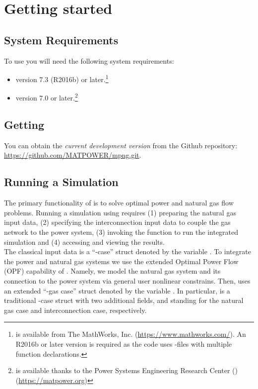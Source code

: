 \chapter{Getting started}
\label{chap:get_started}

\section{System Requirements}
\label{sec:requirements}

To use \mpng{} you will need the following system requirements:

\begin{itemize}
	\item[\checkmark] \matlab{}\textsuperscript{\tiny \textregistered} version 7.3 (R2016b) or later.\footnote{\matlab{} is available from The MathWorks, Inc. (\url{https://www.mathworks.com/}). An R2016b or later \matlab{} version is required as the \mpng{} code uses \matlab{}-files with multiple function declarations.}
	
	\item[\checkmark] \matpower{} version 7.0 or later.\footnote{\matpower{} is available thanks to the Power Systems Engineering Research Center (\pserc) (\url{https://matpower.org})}
\end{itemize}

\section{Getting \mpng{}}
\label{sec:get_mpng}

You can obtain the \emph{current development version} from the \matpower{} Github repository: \url{https://github.com/MATPOWER/mpng.git}.


\section{Running a Simulation}
\label{sec:simulate}

The primary functionality of \mpng{} is to solve optimal power and natural gas flow problems. Running a simulation using \mpng{} requires (1) preparing the natural gas input data, (2) specifying the interconnection input data to couple the gas network to the power system, (3) invoking the function to run the integrated simulation and (4) accessing and viewing the results.\\

The classical \matpower{} input data is a ``\matpower{}-case'' struct denoted by the variable \cite{matpower_manual}. To integrate the power and natural gas systems we use the extended Optimal Power Flow (OPF) capability of \matpower{}. Namely, we model the natural gas system and its connection to the power system via general user nonlinear constrains. Then, \mpng{} uses an extended ``\matpower{}-gas case'' struct denoted by the variable . In particular,  is a traditional \matpower{}-case struct with two additional fields,  and  standing for the natural gas case and interconnection case, respectively.

